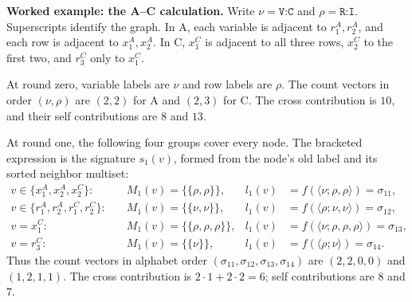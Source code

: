 \documentclass[11pt]{article}
\begin{document}
\begin{enumerate}[label=(AssoE.\arabic*),leftmargin=*]
\medskip
\textbf{Worked example: the A--C calculation.}
Write $\nu=\texttt{V:C}$ and $\rho=\texttt{R:I}$.
Superscripts identify the graph. In A, each variable is adjacent to
$r_1^A,r_2^A$, and each row is adjacent to $x_1^A,x_2^A$.
In C, $x_1^C$ is adjacent to all three rows, $x_2^C$ to the first two,
and $r_3^C$ only to $x_1^C$.

At round zero, variable labels are $\nu$ and row labels are $\rho$.
The count vectors in order $(\nu,\rho)$ are $(2,2)$ for A and
$(2,3)$ for C. The cross contribution is $10$, and their self
contributions are $8$ and $13$.

At round one, the following four groups cover every node.
The bracketed expression is the signature $s_1(v)$, formed from
the node's old label and its sorted neighbor multiset:
\[
\begin{aligned}
v\in\{x_1^A,x_2^A,x_2^C\}:&
\quad M_1(v)=\{\!\{\rho,\rho\}\!\},&
l_1(v)&=f(\langle\nu;\rho,\rho\rangle)=\sigma_{11},\\
v\in\{r_1^A,r_2^A,r_1^C,r_2^C\}:&
\quad M_1(v)=\{\!\{\nu,\nu\}\!\},&
l_1(v)&=f(\langle\rho;\nu,\nu\rangle)=\sigma_{12},\\
v=x_1^C:&
\quad M_1(v)=\{\!\{\rho,\rho,\rho\}\!\},&
l_1(v)&=f(\langle\nu;\rho,\rho,\rho\rangle)=\sigma_{13},\\
v=r_3^C:&
\quad M_1(v)=\{\!\{\nu\}\!\},&
l_1(v)&=f(\langle\rho;\nu\rangle)=\sigma_{14}.
\end{aligned}
\]
Thus the count vectors in alphabet order
$(\sigma_{11},\sigma_{12},\sigma_{13},\sigma_{14})$ are
$(2,2,0,0)$ and $(1,2,1,1)$.
The cross contribution is $2\cdot1+2\cdot2=6$;
self contributions are $8$ and $7$.


\end{enumerate}
\end{document}
